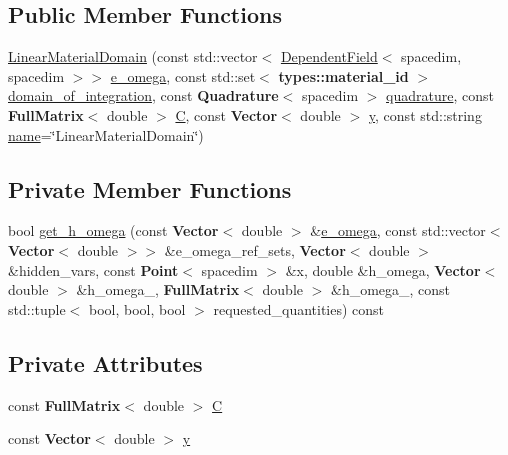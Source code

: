 \subsection*{Public Member Functions}
\begin{DoxyCompactItemize}
\item 
\hyperlink{class_linear_material_domain_a7f91a980e9475691513443cd6b2efbc1}{Linear\+Material\+Domain} (const std\+::vector$<$ \hyperlink{class_dependent_field}{Dependent\+Field}$<$ spacedim, spacedim $>$$>$ \hyperlink{class_scalar_functional_3_01spacedim_00_01spacedim_01_4_adfed9b70b743ba245a39c3e63b951f96}{e\+\_\+omega}, const std\+::set$<$ {\bf types\+::material\+\_\+id} $>$ \hyperlink{class_scalar_functional_3_01spacedim_00_01spacedim_01_4_aa192395f822a64f60df43bf9d36c2f3a}{domain\+\_\+of\+\_\+integration}, const {\bf Quadrature}$<$ spacedim $>$ \hyperlink{class_scalar_functional_3_01spacedim_00_01spacedim_01_4_ab83ee3ae077b211137824b006098382e}{quadrature}, const {\bf Full\+Matrix}$<$ double $>$ \hyperlink{class_linear_material_domain_a8ac95fcf4f77790670b8520ba9593a7c}{C}, const {\bf Vector}$<$ double $>$ \hyperlink{class_linear_material_domain_a7ea9ab6930c0b0aa826e809ef245b0e2}{y}, const std\+::string \hyperlink{class_scalar_functional_3_01spacedim_00_01spacedim_01_4_a195248af3821548af3000872e9e6d00e}{name}=\char`\"{}Linear\+Material\+Domain\char`\"{})
\end{DoxyCompactItemize}
\subsection*{Private Member Functions}
\begin{DoxyCompactItemize}
\item 
bool \hyperlink{class_linear_material_domain_ac071e6886b4e661442af7a003d5f2b2a}{get\+\_\+h\+\_\+omega} (const {\bf Vector}$<$ double $>$ \&\hyperlink{class_scalar_functional_3_01spacedim_00_01spacedim_01_4_adfed9b70b743ba245a39c3e63b951f96}{e\+\_\+omega}, const std\+::vector$<$ {\bf Vector}$<$ double $>$$>$ \&e\+\_\+omega\+\_\+ref\+\_\+sets, {\bf Vector}$<$ double $>$ \&hidden\+\_\+vars, const {\bf Point}$<$ spacedim $>$ \&x, double \&h\+\_\+omega, {\bf Vector}$<$ double $>$ \&h\+\_\+omega\+\_, {\bf Full\+Matrix}$<$ double $>$ \&h\+\_\+omega\+\_, const std\+::tuple$<$ bool, bool, bool $>$ requested\+\_\+quantities) const 
\end{DoxyCompactItemize}
\subsection*{Private Attributes}
\begin{DoxyCompactItemize}
\item 
const {\bf Full\+Matrix}$<$ double $>$ \hyperlink{class_linear_material_domain_a8ac95fcf4f77790670b8520ba9593a7c}{C}
\item 
const {\bf Vector}$<$ double $>$ \hyperlink{class_linear_material_domain_a7ea9ab6930c0b0aa826e809ef245b0e2}{y}
\end{DoxyCompactItemize}

